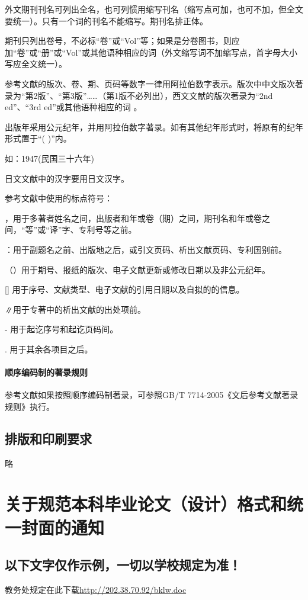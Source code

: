 外文期刊刊名可列出全名，也可列惯用缩写刊名（缩写点可加，也可不加，但全文要统一）。只有一个词的刊名不能缩写。期刊名排正体。

期刊只列出卷号，不必标“卷”或“Vol”等；如果是分卷图书，则应加“卷”或“册”或“Vol”或其他语种相应的词（外文缩写词不加缩写点，首字母大小写应全文统一）。

参考文献的版次、卷、期、页码等数字一律用阿拉伯数字表示。版次中中文版次著录为“第2版”、“第3版”……（第1版不必列出），西文文献的版次著录为“2nd ed”、“3rd ed”或其他语种相应的词 。

出版年采用公元纪年，并用阿拉伯数字著录。如有其他纪年形式时，将原有的纪年形式置于“( )”内。

如：1947(民国三十六年)

日文文献中的汉字要用日文汉字。

参考文献中使用的标点符号：

，用于多著者姓名之间，出版者和年或卷（期）之间，期刊名和年或卷之间，“等”或“译”字、专利号等之前。

：用于副题名之前、出版地之后，或引文页码、析出文献页码、专利国别前。

（）用于期号、报纸的版次、电子文献更新或修改日期以及非公元纪年。

[] 用于序号、文献类型、电子文献的引用日期以及自拟的的信息。

∥用于专著中的析出文献的出处项前。

- 用于起讫序号和起讫页码间。

. 用于其余各项目之后。

\subsubsection{顺序编码制的著录规则}
参考文献如果按照顺序编码制著录，可参照GB/T 7714-2005《文后参考文献著录规则》执行。


\section{排版和印刷要求}略

\chapter{关于规范本科毕业论文（设计）格式和统一封面的通知}
\section*{以下文字仅作示例，一切以学校规定为准！}
教务处规定在此下载\url{http://202.38.70.92/bklw.doc}

